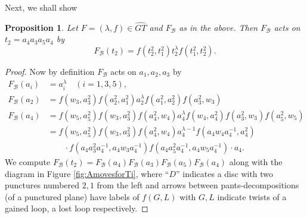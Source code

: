 \documentclass[a4paper,10pt,reqno]{amsart}
\newcommand\FB{F_{\mathcal{B}}}
\newcommand\GT{\widehat{GT}}
\newtheorem{prop}[thm]{Proposition}
\begin{document}
Next, we shall show
\begin{prop}
\label{app-prop-t2}
Let $F=(\lambda,f)\in\GT$ and
$\FB$ as in the above.
Then $F_{\mathcal{B}}$ acts on $t_2=a_4a_3a_5a_4$ by
\begin{equation}
\FB(t_2)= f(t_2^2,t_1^2) t_2^\lambda
f(t_1^2,t_2^2).
\end{equation}
\end{prop}


\begin{proof}
Now by definition $\FB$ acts on $a_1,a_2,a_3$ by 
\begin{align}
\FB(a_i)&=a_i^\lambda \quad (i=1,3,5), \\
\FB(a_2)&=f(w_3,a_3^2) f(a_2^2,a_1^2) a_2^\lambda
f(a_1^2,a_2^2)f(a_3^2,w_3) \\
\FB(a_4)&=f(w_5,a_5^2) f(w_3,a_3^2) f(a_4^2,w_4) 
a_4^\lambda
f(w_4,a_4^2)f(a_3^2,w_3) f(a_5^2,w_5) \\
&=f(w_5,a_5^2) f(w_3,a_3^2) f(a_4^2,w_4) 
a_4^{\lambda-1}
\nonumber
f(a_4w_4a_4^{-1},a_4^2) \\ &{\qquad}\cdot f(a_4a_3^2a_4^{-1},a_4w_3a_4^{-1})f(a_4a_5^2a_4^{-1},a_4w_5a_4^{-1})\cdot a_4. 
\nonumber
\end{align}
We compute $\FB(t_2)=\FB(a_4)\FB(a_3)\FB(a_5)\FB(a_4)$
along with the diagram in Figure \ref{fig:AmovesforTi},
where ``$D$'' indicates a disc with two punctures numbered 
$2,1$ from the left and arrows between pants-decompositions
(of a punctured plane) have labels of $f(G,L)$ with
$G,L$ indicate twists of a gained loop, a lost loop
respectively.


\end{proof}
\end{document}
